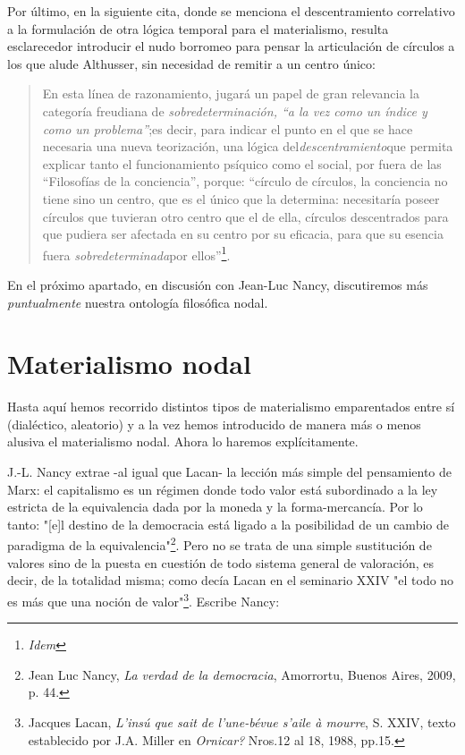 Por último, en la siguiente cita, donde se menciona el descentramiento
correlativo a la formulación de otra lógica temporal para el
materialismo, resulta esclarecedor introducir el nudo borromeo para
pensar la articulación de círculos a los que alude Althusser, sin
necesidad de remitir a un centro único:

\begin{quote}
En esta línea de razonamiento, jugará un papel de gran relevancia la
categoría freudiana de \emph{sobredeterminación, ``a la vez como un
índice y como un problema''};es decir, para indicar el punto en el que
se hace necesaria una nueva teorización, una lógica
del\emph{descentramiento}que permita explicar tanto el funcionamiento
psíquico como el social, por fuera de las ``Filosofías de la
conciencia'', porque: ``círculo de círculos, la conciencia no tiene sino
un centro, que es el único que la determina: necesitaría poseer círculos
que tuvieran otro centro que el de ella, círculos descentrados para que
pudiera ser afectada en su centro por su eficacia, para que su esencia
fuera \emph{sobredeterminada}por ellos''\footnote{\emph{Idem}}.
\end{quote}

En el próximo apartado, en discusión con Jean-Luc Nancy, discutiremos
más \emph{puntualmente} nuestra ontología filosófica nodal.

\section{Materialismo nodal}

Hasta aquí hemos recorrido distintos tipos de materialismo emparentados
entre sí (dialéctico, aleatorio) y a la vez hemos introducido de manera
más o menos alusiva el materialismo nodal. Ahora lo haremos
explícitamente.

J.-L. Nancy extrae -al igual que Lacan- la lección más simple del
pensamiento de Marx: el capitalismo es un régimen donde todo valor está
subordinado a la ley estricta de la equivalencia dada por la moneda y la
forma-mercancía. Por lo tanto: "{[}e{]}l destino de la democracia está
ligado a la posibilidad de un cambio de paradigma de la
equivalencia"\footnote{Jean Luc Nancy, \emph{La verdad de la
  democracia}, Amorrortu, Buenos Aires, 2009, p. 44.}. Pero no se trata
de una simple sustitución de valores sino de la puesta en cuestión de
todo sistema general de valoración, es decir, de la totalidad misma;
como decía Lacan en el seminario XXIV "el todo no es más que una noción
de valor"\footnote{Jacques Lacan, \emph{L'insú que sait de l'une-bévue
  s'aile à mourre}, S. XXIV, texto establecido por J.A. Miller en
  \emph{Ornicar?} Nros.12 al 18, 1988, pp.15.}. Escribe Nancy:

